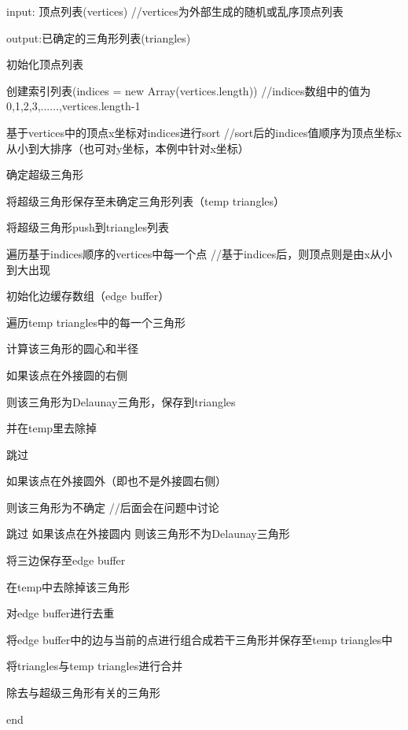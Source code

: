 \documentclass[UTF8,a4paper,8pt]{ctexart}
\begin{document}
	 input: 顶点列表(vertices)                       //vertices为外部生成的随机或乱序顶点列表
	 
	 output:已确定的三角形列表(triangles)
	 
		 初始化顶点列表
		 
		 创建索引列表(indices = new Array(vertices.length))    //indices数组中的值为0,1,2,3,......,vertices.length-1
	 
		 基于vertices中的顶点x坐标对indices进行sort           //sort后的indices值顺序为顶点坐标x从小到大排序（也可对y坐标，本例中针对x坐标）
		 
		 确定超级三角形
		 
		 将超级三角形保存至未确定三角形列表（temp triangles）
		 
		 将超级三角形push到triangles列表
		 
		 遍历基于indices顺序的vertices中每一个点            //基于indices后，则顶点则是由x从小到大出现
				 
			 初始化边缓存数组（edge buffer）
			 
			 遍历temp triangles中的每一个三角形
			 
				 计算该三角形的圆心和半径
				 
				 如果该点在外接圆的右侧
				 
					 则该三角形为Delaunay三角形，保存到triangles
					 
					 并在temp里去除掉
					 
					 跳过
					 
				 如果该点在外接圆外（即也不是外接圆右侧）
				 
					 则该三角形为不确定                      //后面会在问题中讨论
					 
					 跳过
				 如果该点在外接圆内
					 则该三角形不为Delaunay三角形
					 
					 将三边保存至edge buffer
					 
					 在temp中去除掉该三角形
					 
			 对edge buffer进行去重
			 
			 将edge buffer中的边与当前的点进行组合成若干三角形并保存至temp triangles中
	 
		 将triangles与temp triangles进行合并
		 
		 除去与超级三角形有关的三角形
		 
	 end
\end{document}
